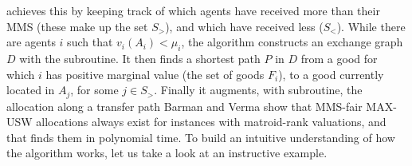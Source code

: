  achieves this by keeping track of which agents have received more than their MMS (these make up the set $S_>$), and which have received less ($S_<$). While there are agents $i$ such that $v_i(A_i) < \mu_i$, the algorithm constructs an exchange graph $D$ with the  subroutine. It then finds a shortest path $P$ in $D$ from a good for which $i$ has positive marginal value (the set of goods $F_i$), to a good currently located in $A_j$, for some $j\in S_>$. Finally it augments, with  subroutine, the allocation along a transfer path  Barman and Verma show that MMS-fair MAX-USW allocations always exist for instances with matroid-rank valuations, and that  finds them in polynomial time. To build an intuitive understanding of how the algorithm works, let us take a look at an instructive example.

